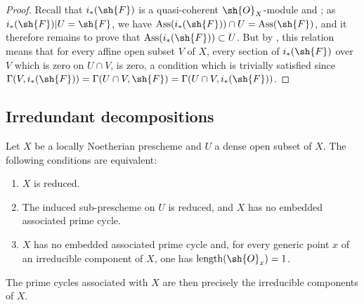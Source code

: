 \begin{proof}
Recall that $i_*(\sh{F})$ is a quasi-coherent $\sh{O}_X$-module  and ; as $i_*(\sh{F})|U=\sh{F}$, we have $\operatorname{Ass}(i_*(\sh{F}))\cap U=\operatorname{Ass}(\sh{F})$, and it therefore remains to prove that $\operatorname{Ass}(i_*(\sh{F}))\subset U$.
But by , this relation means that for every affine open subset $V$ of $X$, every section of $i_*(\sh{F})$ over $V$ which is zero on $U\cap V$, is zero, a condition which is trivially satisfied since $\Gamma(V,i_*(\sh{F}))=\Gamma(U\cap V,\sh{F})=\Gamma(U\cap V,i_*(\sh{F}))$.
\end{proof}


\subsection{Irredundant decompositions}
\label{subsection:IV.3.2}

\begin{proposition}[3.2.1]
\label{IV.3.2.1}
Let $X$ be a locally Noetherian prescheme and $U$ a dense open subset of $X$.
The following conditions are equivalent:
\begin{enumerate}
  \item[\emph{a)}] $X$ is reduced.
  \item[\emph{b)}] The induced sub-prescheme on $U$ is reduced, and $X$ has no embedded associated prime cycle.
  \item[\emph{c)}] $X$ has no embedded associated prime cycle and, for every generic point $x$ of an irreducible component of $X$, one has $\operatorname{length}(\sh{O}_x)=1$.
\end{enumerate}
The prime cycles associated with $X$ are then precisely the irreducible components of $X$.
\end{proposition}

